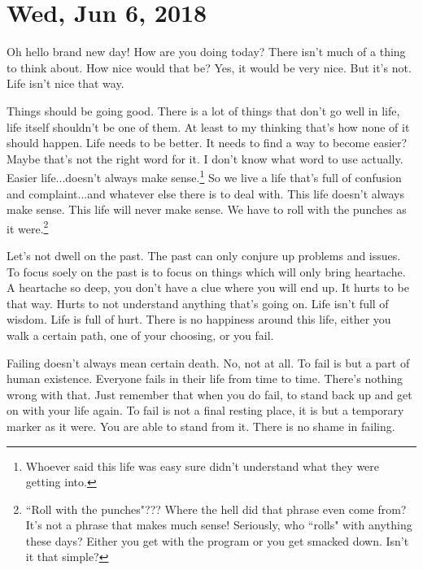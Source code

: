 \section{Wed, Jun 6, 2018}

Oh hello brand new day! How are you doing today? There isn't much of a thing to
think about. How nice would that be? Yes, it would be very nice. But it's not.
Life isn't nice that way.

Things should be going good. There is a lot of things that don't go well in
life, life itself shouldn't be one of them. At least to my thinking that's how
none of it should happen. Life needs to be better. It needs to find a way to
become easier? Maybe that's not the right word for it. I don't know what word to
use actually. Easier life...doesn't always make sense.\footnote{Whoever said
this life was easy sure didn't understand what they were getting into.} So we
live a life that's full of confusion and complaint...and whatever else there is
to deal with. This life doesn't always make sense. This life will never make
sense. We have to roll with the punches as it were.\footnote{``Roll with the
punches"??? Where the hell did that phrase even come from? It's not a phrase
that makes much sense! Seriously, who ``rolls" with anything these days? Either
you get with the program or you get smacked down. Isn't it that simple?}

Let's not dwell on the past. The past can only conjure up problems and issues.
To focus soely on the past is to focus on things which will only bring
heartache. A heartache so deep, you don't have a clue where you will end up. It
hurts to be that way. Hurts to not understand anything that's going on. Life
isn't full of wisdom. Life is full of hurt. There is no happiness around this
life, either you walk a certain path, one of your choosing, or you fail.

Failing doesn't always mean certain death. No, not at all. To fail is but a part
of human existence. Everyone fails in their life from time to time. There's
nothing wrong with that. Just remember that when you do fail, to stand back up
and get on with your life again. To fail is not a final resting place, it is but
a temporary marker as it were. You are able to stand from it. There is no shame
in failing.